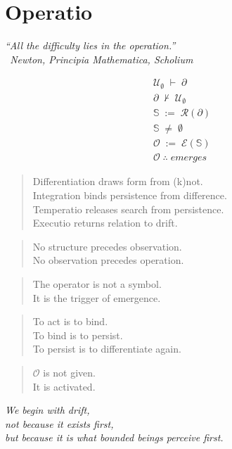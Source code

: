 \chapter*{Operatio}
\label{sec:bk1_operatio}
\begin{flushright}
\emph{``All the difficulty lies in the operation.''}\\
\emph{\textendash\ Newton, \textit{Principia Mathematica}, Scholium}
\end{flushright}
\vspace{1em}
\begin{center}
\Large
\renewcommand{\arraystretch}{1.35}
\[
\begin{array}{l}
\mathcal{U}_{\emptyset} \;\vdash\; \partial \\
\partial \;\nvdash\; \mathcal{U}_{\emptyset} \\
\mathbb{S} \;:=\; \mathcal{R}(\partial) \\
\mathbb{S} \;\neq\; \emptyset \\
\mathcal{O} \;:=\; \mathcal{E}(\mathbb{S}) \\
\mathcal{O} \;\therefore\; \textit{emerges}
\end{array}
\]
\end{center}
\vspace{1em}
\begin{quote}
Differentiation draws form from (k)not.\\
Integration binds persistence from difference.\\
Temperatio releases search from persistence.\\
Executio returns relation to drift.
\end{quote}
\begin{quote}
No structure precedes observation.\\
No observation precedes operation.
\end{quote}
\begin{quote}
The operator is not a symbol.\\
It is the trigger of emergence.
\end{quote}
\begin{quote}
To act is to bind.\\
To bind is to persist.\\
To persist is to differentiate again.
\end{quote}
\begin{quote}
$\mathcal{O}$ is not given.\\
It is activated.
\end{quote}
\begin{center}
\emph{We begin with drift,\\
not because it exists first,\\
but because it is what bounded beings perceive first.}
\end{center}
